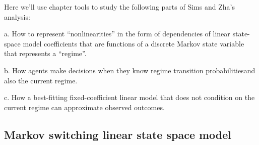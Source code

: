 \noindent Here we'll use chapter  tools to  study the following  parts of Sims and Zha's analysis:

\medskip
\item{a.} How to represent ``nonlinearities'' in the form of dependencies of linear state-space model 
coefficients that are functions of  a discrete  Markov state variable that
represents a ``regime''.

\medskip
\item{b.} How agents make decisions when they  know regime transition probabilitiesand also  the current regime.

\medskip
\item{c.} How   a best-fitting fixed-coefficient linear model that does not condition on the current regime  can approximate observed 
outcomes.


\medskip

\subsection{Markov switching linear state space model}

